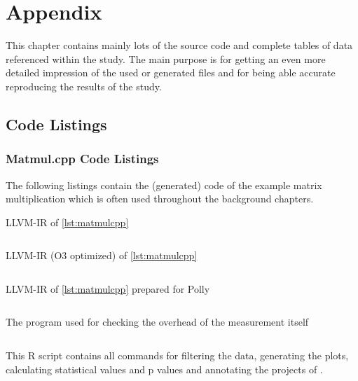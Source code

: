 \chapter{Appendix}
This chapter contains mainly lots of the source code and complete tables of data referenced within the study.
The main purpose is for getting an even more detailed impression of the used or generated files and for being able accurate reproducing the results of the study.

\section{Code Listings}
\subsection{Matmul.cpp Code Listings}
The following listings contain the (generated) code of the example matrix multiplication which is often used throughout the background chapters.
\begin{code}
    \caption{LLVM-IR of \autoref{lst:matmulcpp}}
    \inputminted[fontsize=\tiny]{LLVM}{ll/matmul.ll}
    \label{lst:matmulll}
\end{code}
\begin{code}
    \caption{LLVM-IR (O3 optimized) of \autoref{lst:matmulcpp}}
    \inputminted[fontsize=\tiny]{LLVM}{ll/matmulO3.ll}
    \label{lst:matmulllO3}
\end{code}
\begin{code}
    \caption{LLVM-IR of \autoref{lst:matmulcpp} prepared for Polly}
    \inputminted[fontsize=\tiny]{LLVM}{ll/matmul.preopt.ll}
    \label{lst:matmulpreoptll}
\end{code}
\begin{code}
    \caption[Program for checking overhead]{The program used for checking the overhead of the measurement itself}
    \inputminted{c++}{cpp/checkMeasurementOverhead.cpp}
    \label{lst:checkOverhead}
\end{code}
\begin{code}
    \caption[Script for plots and statistic]{This R script contains all commands for filtering the data, generating the plots, calculating statistical values and p values and annotating the projects of \lnt.}
    \inputminted[fontsize=\tiny]{R}{r/generatePlotsAndTables.R}
    \label{lst:rscript}
\end{code}

